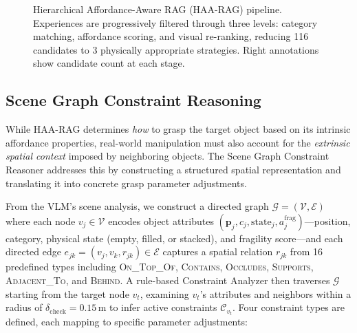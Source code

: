 \documentclass[letterpaper, 10pt, conference]{ieeeconf}
\newcommand{\haarag}{HAA-RAG}
\begin{document}
\begin{figure}[t]
{
    }
    \caption{Hierarchical Affordance-Aware RAG (\haarag{}) pipeline. Experiences are progressively filtered through three levels: category matching, affordance scoring, and visual re-ranking, reducing 116 candidates to 3 physically appropriate strategies. Right annotations show candidate count at each stage.}
    \label{fig:haarag}
\end{figure}

\subsection{Scene Graph Constraint Reasoning}
\label{sec:scene_graph}

While \haarag{} determines \emph{how} to grasp the target object based on its intrinsic affordance properties, real-world manipulation must also account for the \emph{extrinsic spatial context} imposed by neighboring objects.
The Scene Graph Constraint Reasoner addresses this by constructing a structured spatial representation and translating it into concrete grasp parameter adjustments.

From the VLM's scene analysis, we construct a directed graph $\mathcal{G} = (\mathcal{V}, \mathcal{E})$ where each node $v_j \in \mathcal{V}$ encodes object attributes $(\mathbf{p}_j, c_j, \mathrm{state}_j, a_j^{\mathrm{frag}})$---position, category, physical state (empty, filled, or stacked), and fragility score---and each directed edge $e_{jk} = (v_j, v_k, r_{jk}) \in \mathcal{E}$ captures a spatial relation $r_{jk}$ from 16 predefined types including \textsc{On\_Top\_Of}, \textsc{Contains}, \textsc{Occludes}, \textsc{Supports}, \textsc{Adjacent\_To}, and \textsc{Behind}.
A rule-based Constraint Analyzer then traverses $\mathcal{G}$ starting from the target node $v_t$, examining $v_t$'s attributes and neighbors within a radius of $\delta_{\mathrm{check}} = 0.15$\,m to infer active constraints $\mathcal{C}_{v_t}$.
Four constraint types are defined, each mapping to specific parameter adjustments:
\end{document}
